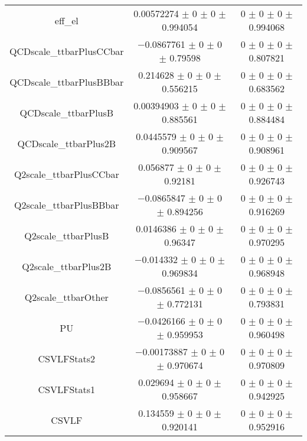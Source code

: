 \begin{table}
\begin{tabular}{ccc}
eff\_el 	& \num{0.00572274} $\pm$ \num{0} $\pm$ \num{0} $\pm$ \num{0.994054} 	& \num{0} $\pm$ \num{0} $\pm$ \num{0} $\pm$ \num{0.994068}\\
QCDscale\_ttbarPlusCCbar 	& \num{-0.0867761} $\pm$ \num{0} $\pm$ \num{0} $\pm$ \num{0.79598} 	& \num{0} $\pm$ \num{0} $\pm$ \num{0} $\pm$ \num{0.807821}\\
QCDscale\_ttbarPlusBBbar 	& \num{0.214628} $\pm$ \num{0} $\pm$ \num{0} $\pm$ \num{0.556215} 	& \num{0} $\pm$ \num{0} $\pm$ \num{0} $\pm$ \num{0.683562}\\
QCDscale\_ttbarPlusB 	& \num{0.00394903} $\pm$ \num{0} $\pm$ \num{0} $\pm$ \num{0.885561} 	& \num{0} $\pm$ \num{0} $\pm$ \num{0} $\pm$ \num{0.884484}\\
QCDscale\_ttbarPlus2B 	& \num{0.0445579} $\pm$ \num{0} $\pm$ \num{0} $\pm$ \num{0.909567} 	& \num{0} $\pm$ \num{0} $\pm$ \num{0} $\pm$ \num{0.908961}\\
Q2scale\_ttbarPlusCCbar 	& \num{0.056877} $\pm$ \num{0} $\pm$ \num{0} $\pm$ \num{0.92181} 	& \num{0} $\pm$ \num{0} $\pm$ \num{0} $\pm$ \num{0.926743}\\
Q2scale\_ttbarPlusBBbar 	& \num{-0.0865847} $\pm$ \num{0} $\pm$ \num{0} $\pm$ \num{0.894256} 	& \num{0} $\pm$ \num{0} $\pm$ \num{0} $\pm$ \num{0.916269}\\
Q2scale\_ttbarPlusB 	& \num{0.0146386} $\pm$ \num{0} $\pm$ \num{0} $\pm$ \num{0.96347} 	& \num{0} $\pm$ \num{0} $\pm$ \num{0} $\pm$ \num{0.970295}\\
Q2scale\_ttbarPlus2B 	& \num{-0.014332} $\pm$ \num{0} $\pm$ \num{0} $\pm$ \num{0.969834} 	& \num{0} $\pm$ \num{0} $\pm$ \num{0} $\pm$ \num{0.968948}\\
Q2scale\_ttbarOther 	& \num{-0.0856561} $\pm$ \num{0} $\pm$ \num{0} $\pm$ \num{0.772131} 	& \num{0} $\pm$ \num{0} $\pm$ \num{0} $\pm$ \num{0.793831}\\
PU 	& \num{-0.0426166} $\pm$ \num{0} $\pm$ \num{0} $\pm$ \num{0.959953} 	& \num{0} $\pm$ \num{0} $\pm$ \num{0} $\pm$ \num{0.960498}\\
CSVLFStats2 	& \num{-0.00173887} $\pm$ \num{0} $\pm$ \num{0} $\pm$ \num{0.970674} 	& \num{0} $\pm$ \num{0} $\pm$ \num{0} $\pm$ \num{0.970809}\\
CSVLFStats1 	& \num{0.029694} $\pm$ \num{0} $\pm$ \num{0} $\pm$ \num{0.958667} 	& \num{0} $\pm$ \num{0} $\pm$ \num{0} $\pm$ \num{0.942925}\\
CSVLF 	& \num{0.134559} $\pm$ \num{0} $\pm$ \num{0} $\pm$ \num{0.920141} 	& \num{0} $\pm$ \num{0} $\pm$ \num{0} $\pm$ \num{0.952916}\\

\end{tabular}
\end{table}
